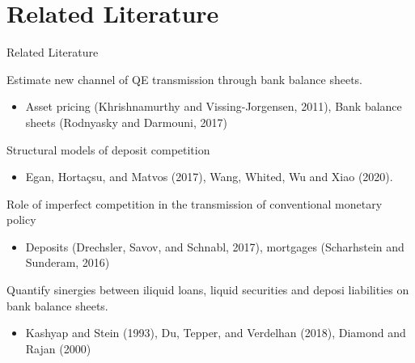 \documentclass[notes,11pt, aspectratio=169]{beamer}
\newenvironment{wideitemize}{\itemize\addtolength{\itemsep}{10pt}}{\enditemize}
\begin{document}
\section{Related Literature}
\begin{frame}[label = lit]{Related Literature}

  \begin{wideitemize}
      \item Estimate new channel of QE transmission through bank balance sheets. 
      
      \begin{itemize}
        \item Asset pricing (Khrishnamurthy and Vissing-Jorgensen, 2011), Bank balance sheets (Rodnyasky and Darmouni, 2017)  
        
      \end{itemize}


          \item Structural models of deposit competition

          \begin{itemize}
            \item Egan, Hortaçsu, and Matvos (2017),  Wang, Whited, Wu and Xiao (2020).
          \end{itemize}
      
      \item Role of imperfect competition in the transmission of conventional monetary policy 
      \begin{itemize}
        \item  Deposits (Drechsler, Savov, and Schnabl, 2017), mortgages (Scharhstein and Sunderam, 2016)
      \end{itemize}
      

      \item Quantify sinergies between iliquid loans, liquid securities and deposi liabilities on bank balance sheets. 
      
      \begin{itemize}
        \item Kashyap and Stein (1993), Du, Tepper, and Verdelhan (2018), Diamond and Rajan (2000)
    \end{itemize}
      

  \end{wideitemize}
  
\end{frame}

\end{document}
